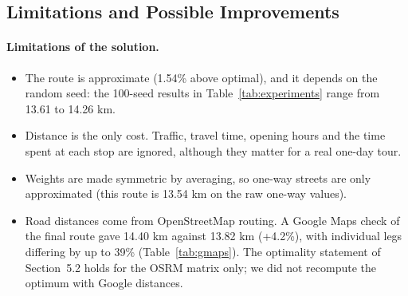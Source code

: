 \subsection{Limitations and Possible Improvements}\label{sec:limitations}
\paragraph{Limitations of the solution.}
\begin{itemize}
      \item The route is approximate (1.54\% above optimal), and it depends on the
            random seed: the 100-seed results in Table~\ref{tab:experiments} range from
            13.61 to 14.26 km.
  \item Distance is the only cost. Traffic, travel time, opening hours and the time spent at each stop
        are ignored, although they matter for a real one-day tour.
  \item Weights are made symmetric by averaging, so one-way streets are only approximated (this route is
        13.54 km on the raw one-way values).
  \item Road distances come from OpenStreetMap routing. A Google Maps check of
        the final route gave 14.40 km against 13.82 km (+4.2\%), with individual
        legs differing by up to 39\% (Table~\ref{tab:gmaps}). The optimality
        statement of Section~5.2 holds for the OSRM matrix only; we did not
        recompute the optimum with Google distances.
\end{itemize}

